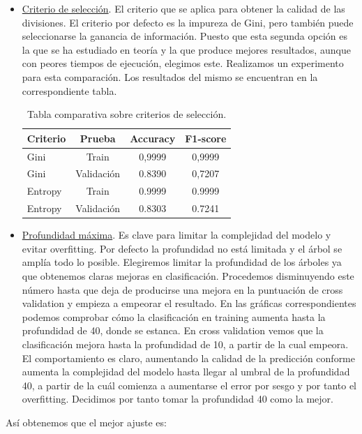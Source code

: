 \documentclass[11pt,a4paper]{article}
\begin{document}
\begin{itemize}
\item \underline{Criterio de selección}. El criterio que se aplica para obtener la calidad de las divisiones. El criterio por defecto es la impureza de Gini, pero también puede seleccionarse la ganancia de información. Puesto que esta segunda opción es la que se ha estudiado en teoría y la que produce mejores resultados, aunque con peores tiempos de ejecución, elegimos este. Realizamos un experimento para esta comparación. Los resultados del mismo se encuentran en la correspondiente tabla.

\begin{table}[h]
\begin{center}
\begin{tabular}{|l|c|c|c|}
\hline
  Criterio & Prueba & Accuracy & F1-score \\ \hline
  Gini & Train & 0,9999 & 0,9999 \\
  Gini & Validación & 0.8390 & 0,7207  \\
  Entropy & Train & 0.9999 & 0.9999 \\
  Entropy & Validación & 0.8303 & 0.7241 \\\hline
\end{tabular}
\caption{Tabla comparativa sobre criterios de selección.}
\end{center}
\end{table}

 
\item \underline{Profundidad máxima}. Es clave para limitar la complejidad del modelo y evitar overfitting. Por defecto la profundidad no está limitada y el árbol se amplía todo lo posible. Elegiremos limitar la profundidad de los árboles ya que obtenemos claras mejoras en clasificación. Procedemos disminuyendo este número hasta que deja de producirse una mejora en la puntuación de cross validation y empieza a empeorar el resultado. En las gráficas correspondientes podemos comprobar cómo la clasificación en training aumenta hasta la profundidad de 40, donde se estanca. En cross validation vemos que la clasificación mejora hasta la profundidad de 10, a partir de la cual empeora. El comportamiento es claro, aumentando la calidad de la predicción conforme aumenta la complejidad del modelo hasta llegar al umbral de la profundidad 40, a partir de la cuál comienza a aumentarse el error por sesgo y por tanto el overfitting. Decidimos por tanto tomar la profundidad 40 como la mejor.
\end{itemize}

Así obtenemos que el mejor ajuste es:
\end{document}
